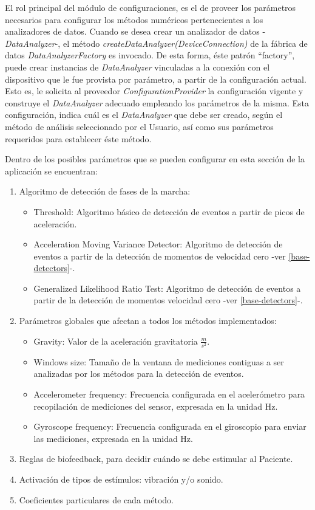 El rol principal del módulo de configuraciones, es el de proveer los parámetros necesarios para configurar los métodos numéricos pertenecientes a los analizadores de datos. Cuando se desea crear un analizador de datos -\textit{DataAnalyzer}-, el método \textit{createDataAnalyzer(DeviceConnection)} de la fábrica de datos  \textit{DataAnalyzerFactory} es invocado. De esta forma, éste patrón ``factory'', puede crear instancias de \textit{DataAnalyzer} vinculadas a la conexión con el dispositivo que le fue provista por parámetro, a partir de la configuración actual. Esto es, le solicita al proveedor \textit{ConfigurationProvider} la configuración vigente y construye el \textit{DataAnalyzer} adecuado empleando los parámetros de la misma. Esta configuración, indica cuál es el \textit{DataAnalyzer} que debe ser creado, según el método de análisis seleccionado por el Usuario, así como sus parámetros requeridos para establecer éste método. 

Dentro de los posibles parámetros que se pueden configurar en esta sección de la aplicación se encuentran:

\begin{enumerate}
    \item Algoritmo de detección de fases de la marcha:
    \begin{itemize}
        \item Threshold: Algoritmo básico de detección de eventos a partir de picos de aceleración. 
        \item Acceleration Moving Variance Detector: Algoritmo de detección de eventos a partir de la detección de momentos de velocidad cero -ver \ref{base-detectors}-.
        \item Generalized Likelihood Ratio Test: Algoritmo de detección de eventos a partir de la detección de momentos velocidad cero -ver \ref{base-detectors}-.
    \end{itemize}
    \item Parámetros globales que afectan a todos los métodos implementados:
    \begin{itemize}
        \item Gravity: Valor de la aceleración gravitatoria \(\frac{m}{s^2}\).
        \item Windows size: Tamaño de la ventana de mediciones contiguas a ser analizadas por los métodos para la detección de eventos. 
        \item Accelerometer frequency: Frecuencia configurada en el acelerómetro para recopilación de mediciones del sensor, expresada en la unidad Hz.
        \item Gyroscope frequency: Frecuencia configurada en el giroscopio para enviar las mediciones, expresada en la unidad Hz. 
    \end{itemize}
    \item Reglas de biofeedback, para decidir cuándo se debe estimular al Paciente.
    \item Activación de tipos de estímulos: vibración y/o sonido.
    \item Coeficientes particulares de cada método.
\end{enumerate}

